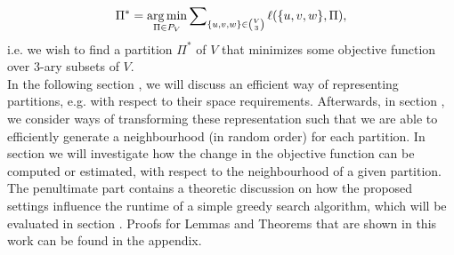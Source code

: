 \begin{align*}
    \Pi^* = \operatorname*{\arg\min}_{\Pi \in P_V} \sum\nolimits_{\{u,v,w\} \in \binom{V}{3}} \ell(\{u,v,w\},\Pi),
\end{align*}
i.e. we wish to find a partition $\Pi^*$ of $V$ that minimizes some objective function over $3$-ary subsets of $V$. 
\\
In the following section \emph{}, we will discuss an efficient way of representing partitions, e.g. with respect to their space requirements. Afterwards, in section \emph{}, we consider ways of transforming these representation such that we are able to efficiently generate a neighbourhood (in random order) for each partition. In section \emph{} we will investigate how the change in the objective function can be computed or estimated, with respect to the neighbourhood of a given partition. The penultimate part \emph{} contains a theoretic discussion on how the proposed settings influence the runtime of a simple greedy search algorithm, which will be evaluated in section \emph{}. Proofs for Lemmas and Theorems that are shown in this work can be found in the appendix.